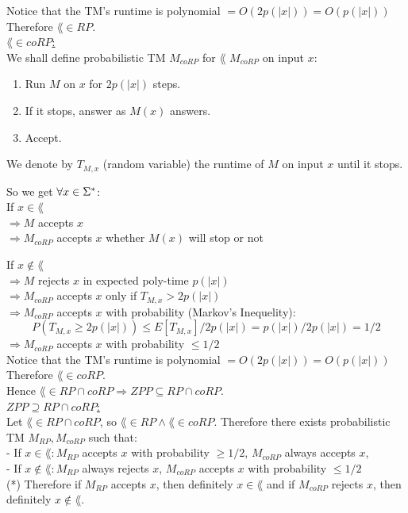 Notice that the TM's runtime is polynomial $= O(2p(|x|)) = O(p(|x|))$ \\
Therefore $\lang \in RP$. \\

\underline{$\lang \in coRP$:} \\
We shall define probabilistic TM $M_{coRP}$ for $\lang$
$M_{coRP}$ on input $x$:
\begin{enumerate}[1., itemsep=5pt]
    \item Run $M$ on $x$ for $2p(|x|)$ steps.
    \item If it stops, answer as $M(x)$ answers.
    \item Accept.
\end{enumerate}
We denote by $T_{M,x}$ (random variable) the runtime of $M$ on input $x$ until it stops.

\pagebreak
So we get $\forall x \in \Sigma^*$: \\
If $x \in \lang$ \\
$\Longrightarrow M$ accepts $x$ \\
$\Longrightarrow M_{coRP}$ accepts $x$ whether $M(x)$ will stop or not

If $x \notin \lang$ \\
$\Longrightarrow M$ rejects $x$ in expected poly-time $p(|x|)$ \\
$\Longrightarrow M_{coRP}$ accepts $x$ only if $T_{M,x} > 2p(|x|)$ \\
$\Longrightarrow M_{coRP}$ accepts $x$ with probability (Markov's Inequelity):
\[ P(T_{M,x} \geq 2p(|x|)) \leq E[T_{M,x}] / 2p(|x|) = p(|x|) / 2p(|x|) = 1/2 \]
$\Longrightarrow M_{coRP}$ accepts $x$ with probability $\leq 1/2$ \\

Notice that the TM's runtime is polynomial $= O(2p(|x|)) = O(p(|x|))$ \\
Therefore $\lang \in coRP$. \\

Hence $\lang \in RP \cap coRP \Rightarrow ZPP \subseteq RP \cap coRP$. \\

\underline{$ZPP \supseteq RP \cap coRP$:} \\
Let $\lang \in RP \cap coRP$, so $\lang \in RP \wedge \lang \in coRP$. Therefore there exists
probabilistic TM $M_{RP}, M_{coRP}$ such that: \\
- If $x \in    \lang: M_{RP}$ accepts $x$ with probability $\geq 1/2$, $M_{coRP}$ always accepts $x$,  \\
- If $x \notin \lang: M_{RP}$ always rejects $x$, $M_{coRP}$ accepts $x$ with probability $\leq 1/2$ \\
(*) Therefore if $M_{RP}$ accepts $x$, then definitely $x \in \lang$
and if $M_{coRP}$ rejects $x$, then definitely $x \notin \lang$. \\


